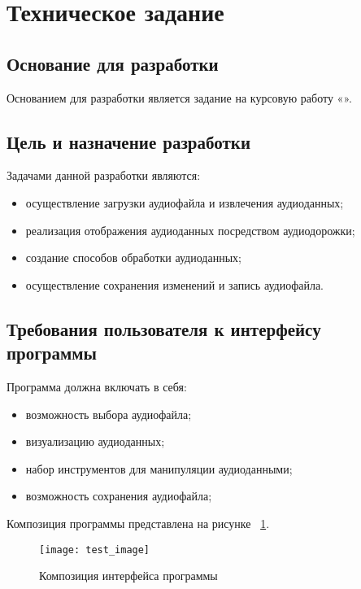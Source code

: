 \section{Техническое задание}
\subsection{Основание для разработки}

Основанием для разработки является задание на курсовую работу «».

\subsection{Цель и назначение разработки}

Задачами данной разработки являются:
\begin{itemize}
\item осуществление загрузки аудиофайла и извлечения аудиоданных;
\item реализация отображения аудиоданных посредством аудиодорожки;
\item создание способов обработки аудиоданных;
\item осуществление сохранения изменений и запись аудиофайла.
\end{itemize}

\subsection{Требования пользователя к интерфейсу программы}

Программа должна включать в себя:
\begin{itemize}
    \item возможность выбора аудиофайла;
    \item визуализацию аудиоданных;
    \item набор инструментов для манипуляции аудиоданными;
    \item возможность сохранения аудиофайла;
\end{itemize}

Композиция программы представлена на рисунке ~\ref{test_image:image}.

\begin{figure}[ht]
\texttt{[image: test\_image]}
\caption{Композиция интерфейса программы}
\label{test_image:image}
\end{figure}

